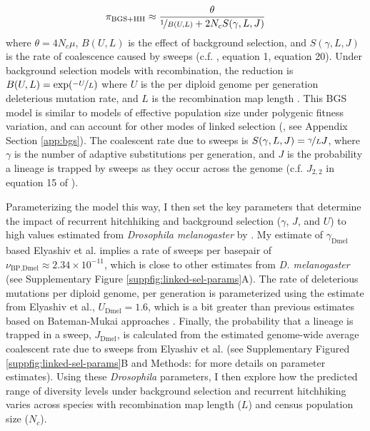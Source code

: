 \documentclass[11pt]{article}
\newcommand{\Newnameref}[1]{\textit{\nameref{#1}}}
\begin{document}
\begin{align} 
  \pi_\text{BGS+HH} \approx \frac{\theta}{\nicefrac{1}{B(U, L)} + 2N_c S(\gamma, L, J)} 
  \label{eqn:div} 
\end{align}
%
where $\theta = 4N_c\mu$, $B(U,L)$ is the effect of background selection, and
$S(\gamma, L, J)$ is the rate of coalescence caused by sweeps (c.f.
\cite{Elyashiv2016-vt}, equation 1, \cite{Coop2012-cd} equation 20). Under
background selection models with recombination, the reduction is $B(U,L) =
\exp(\nicefrac{-U}{L})$ where $U$ is the per diploid genome per generation
deleterious mutation rate, and $L$ is the recombination map length
\parencite{Hudson1994-oh,Hudson1995-xc,Nordborg1996-nq}. This BGS model is
similar to models of effective population size under polygenic fitness
variation, and can account for other modes of linked selection
(\cite{Robertson1961-ho,Santiago1995-hx,Santiago1998-bs}, see Appendix Section
\ref{app:bgs}). The coalescent rate due to sweeps is $S(\gamma, L, J) =
\nicefrac{\gamma}{L} J$, where $\gamma$ is the number of adaptive substitutions
per generation, and $J$ is the probability a lineage is trapped by sweeps as
they occur across the genome (c.f. $J_{2,2}$ in equation 15 of
\cite{Coop2012-cd}). 

Parameterizing the model this way, I then set the key parameters that determine
the impact of recurrent hitchhiking and background selection ($\gamma$, $J$,
and $U$) to high values estimated from \emph{Drosophila melanogaster} by
\textcite{Elyashiv2016-vt}. My estimate of $\gamma_\text{Dmel}$ based Elyashiv
et al. implies a rate of sweeps per basepair of $\nu_\text{BP,Dmel} \approx
2.34 \times 10^{-11}$, which is close to other estimates from \emph{D.
melanogaster} (see Supplementary Figure \ref{suppfig:linked-sel-params}A). The
rate of deleterious mutations per diploid genome, per generation is
parameterized using the estimate from Elyashiv et al., $U_\text{Dmel} = 1.6$,
which is a bit greater than previous estimates based on Bateman-Mukai
approaches \parencite{Mukai1985-bc,Mukai1988-vs,Charlesworth1987-ab}. Finally,
the probability that a lineage is trapped in a sweep, $J_\text{Dmel}$, is
calculated from the estimated genome-wide average coalescent rate due to sweeps
from Elyashiv et al. (see Supplementary Figured
\ref{suppfig:linked-sel-params}B and Methods:
\Newnameref{sec:methods-reduction} for more details on parameter estimates).
Using these \emph{Drosophila} parameters, I then explore how the predicted
range of diversity levels under background selection and recurrent hitchhiking
varies across species with recombination map length ($L$) and census population
size ($N_c$).
\end{document}
